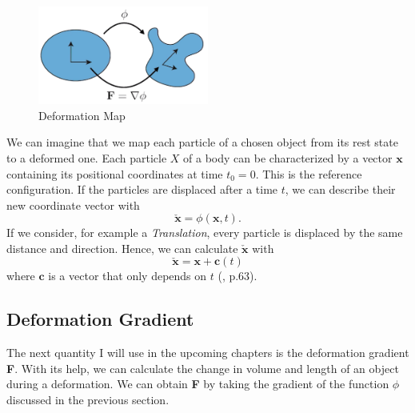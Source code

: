 \begin{figure}[!htbp]
	\centering
	\includegraphics[width=0.5\textwidth]{resources/deformation_map}
	\caption[Deformation Map]{Deformation Map {\cite{STREAM2018}}}
	\label{fig:deformationmap}
\end{figure}

We can imagine that we map each particle of a chosen object from its rest state to a deformed one. Each particle $X$ of a body can be characterized by a vector $\mathbf{x}$ containing its positional coordinates at time $t_0=0$. This is the reference configuration. If the particles are displaced after a time $t$, we can describe their new coordinate vector with 
\[
	\check{\mathbf{x}} = \phi (\mathbf{x}, t).
\]
If we consider, for example a \textit{Translation}, every particle is displaced by the same distance and direction. Hence, we can calculate $\check{\mathbf{x}}$ with
\[
	\check{\mathbf{x}} = \mathbf{x} + \mathbf{c}(t)
\]
where $\mathbf{c}$ is a vector that only depends on $t$ (\cite{Spencer1980}, p.63).



\subsection{Deformation Gradient}
The next quantity I will use in the upcoming chapters is the deformation gradient \textbf{F}. With its help, we can calculate the change in volume and length of an object during a deformation. We can obtain \textbf{F} by taking the gradient of the function $\phi$ discussed in the previous section.

